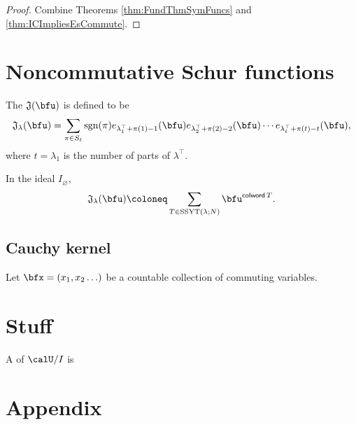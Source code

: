 \documentclass{article}
\newcommand*\colword{\operatorname{\mathsf{colword}}}
\newcommand*\frkJ{\mathfrak{J}}
\newcommand*\SSYT{\operatorname{SSYT}}
\newcommand*\sgn{\operatorname{sgn}}
\begin{document}
\begin{proof}
    Combine Theorems \ref{thm:FundThmSymFuncs} and \ref{thm:ICImpliesEsCommute}.
\end{proof}



\section{
    Noncommutative Schur functions
}

\begin{definition}
    The  $\frkJ(\bfu)$ is defined to be
    \[
        \frkJ_\lambda(\bfu)
        =
        \sum_{\pi \in S_{t}}
        \sgn(\pi)
        e_{\lambda^\top_1+\pi(1)-1}(\bfu)
        e_{\lambda^\top_2+\pi(2)-2}(\bfu)
        \cdots
        e_{\lambda^\top_{t}+\pi(t)-t}(\bfu),
    \]
    where $t = \lambda_1$ is the number of parts of $\lambda^\top$.
\end{definition}

\begin{theorem}
    In the ideal $I_\varnothing$,
    \[
        \frkJ_\lambda(\bfu)
        \coloneq
        \sum_{T \in \SSYT(\lambda;N)}
        \bfu^{\colword T}.
    \]
\end{theorem}

\subsection{Cauchy kernel}

\begin{definition}
    Let $\bfx = (x_1,x_2\ldots)$ be a countable collection of commuting variables.
\end{definition}

\section{Stuff}

\begin{definition}
    A  of $\calU/I$ is
\end{definition}

\begin{definition}
\end{definition}


\section{Appendix}
\end{document}
